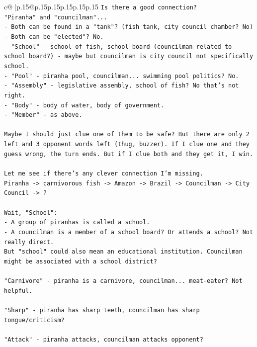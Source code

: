 \documentclass{article}
\begin{document}
{\begin{supertabular}{c@{$\;$}|p{.15\linewidth}@{}p{.15\linewidth}p{.15\linewidth}p{.15\linewidth}p{.15\linewidth}p{.15\linewidth}}
{{{\texttt{Is there a good connection?} \\
\texttt{"Piranha" and "councilman"...} \\
\texttt{{-} Both can be found in a "tank"? (fish tank, city council chamber? No)} \\
\texttt{{-} Both can be "elected"? No.} \\
\texttt{{-} "School" {-} school of fish, school board (councilman related to school board?) {-} maybe but councilman is city council not specifically school.} \\
\texttt{{-} "Pool" {-} piranha pool, councilman... swimming pool politics? No.} \\
\texttt{{-} "Assembly" {-} legislative assembly, school of fish? No that's not right.} \\
\texttt{{-} "Body" {-} body of water, body of government.} \\
\texttt{{-} "Member" {-} as above.} \\
\\ 
\texttt{Maybe I should just clue one of them to be safe? But there are only 2 left and 3 opponent words left (thug, buzzer). If I clue one and they guess wrong, the turn ends. But if I clue both and they get it, I win.} \\
\\ 
\texttt{Let me see if there's any clever connection I'm missing.} \\
\texttt{Piranha {-}> carnivorous fish {-}> Amazon {-}> Brazil {-}> Councilman {-}> City Council {-}> ?} \\
\\ 
\texttt{Wait, "School":} \\
\texttt{{-} A group of piranhas is called a school.} \\
\texttt{{-} A councilman is a member of a school board? Or attends a school? Not really direct.} \\
\texttt{But "school" could also mean an educational institution. Councilman might be associated with a school district?} \\
\\ 
\texttt{"Carnivore" {-} piranha is a carnivore, councilman... meat{-}eater? Not helpful.} \\
\\ 
\texttt{"Sharp" {-} piranha has sharp teeth, councilman has sharp tongue/criticism?} \\
\\ 
\texttt{"Attack" {-} piranha attacks, councilman attacks opponent?} \\
}}}
\end{supertabular}}
\end{document}
